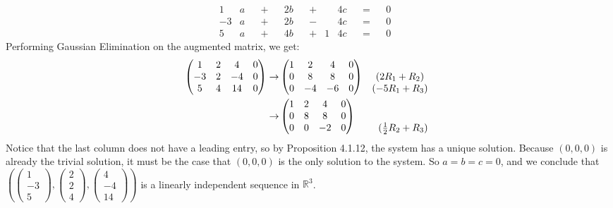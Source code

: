 \documentclass[12pt]{article}
\newenvironment{problem}[2][Problem]
{
	\begin{trivlist} 
		\item[\hskip \labelsep {\bfseries #1 #2:}]
	}
{
	\end{trivlist}
	}
\newenvironment{solution}[1][Solution]
{
	\begin{trivlist} 
		\item[\hskip \labelsep {\itshape #1:}]
	}
	{
	\end{trivlist}
}
\begin{document}
\begin{problem}{1}
\begin{solution}
\begin{align*}
&&&&&&&& &&&&&&&& &&&&&&&& 1&a& &+& &2b& &+& &4c& &=& &0& &&&&&&&& &&&&&&&& &&&&&&&&\\
&&&&&&&& &&&&&&&& &&&&&&&& -3&a& &+& &2b& &-& &4c& &=& &0& &&&&&&&& &&&&&&&& &&&&&&&&\\
&&&&&&&& &&&&&&&& &&&&&&&& 5&a& &+& &4b& &+& 1&4c& &=& &0& &&&&&&&& &&&&&&&& &&&&&&&&
\end{align*}
Performing Gaussian Elimination on the augmented matrix, we get:
\begin{align*}
\begin{pmatrix}1&2&4&0\\-3&2&-4&0\\5&4&14&0\end{pmatrix} \rightarrow & \begin{pmatrix}1&2&4&0\\0&8&8&0\\0&-4&-6&0\end{pmatrix} & \begin{matrix} \hphantom{1}\\ (2R_1+R_2)\hphantom{1}\\ (-5R_1+R_3)\hphantom{1}\end{matrix} \\
\rightarrow & \begin{pmatrix}1&2&4&0\\0&8&8&0\\0&0&-2&0\end{pmatrix} & \begin{matrix} \hphantom{1}\\ \hphantom{1}\\ (\frac{1}{2}R_2+R_3)\hphantom{1}\end{matrix} \\
\end{align*}
Notice that the last column does not have a leading entry, so by Proposition 4.1.12, the system has a unique solution. Because $(0,0,0)$ is already the trivial solution, it must be the case that $(0,0,0)$ is the only solution to the system. So $a=b=c=0$, and we conclude that $\left(\begin{pmatrix}1\\-3\\5\end{pmatrix}, \begin{pmatrix}2\\2\\4\end{pmatrix}, \begin{pmatrix}4\\-4\\14\end{pmatrix}\right)$ is a linearly independent sequence in $\mathbb{R}^3$.
\end{solution}
\end{problem}
\end{document}
